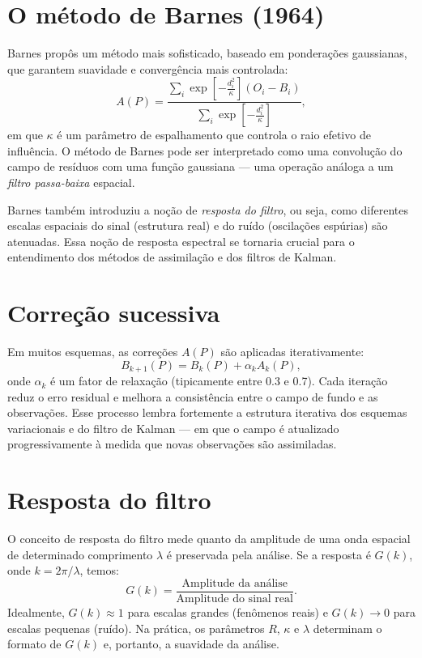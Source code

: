 \section{O método de Barnes (1964)}
Barnes propôs um método mais sofisticado, baseado em ponderações gaussianas, que garantem suavidade e convergência mais controlada:
\begin{equation}
A(P) = \frac{\displaystyle \sum_i \exp\!\left[-\frac{d_i^2}{\kappa}\right] (O_i - B_i)}{\displaystyle \sum_i \exp\!\left[-\frac{d_i^2}{\kappa}\right]},
\label{eq:barnes}
\end{equation}
em que $\kappa$ é um parâmetro de espalhamento que controla o raio efetivo de influência.  
O método de Barnes pode ser interpretado como uma convolução do campo de resíduos com uma função gaussiana — uma operação análoga a um \emph{filtro passa-baixa} espacial.

Barnes também introduziu a noção de \emph{resposta do filtro}, ou seja, como diferentes escalas espaciais do sinal (estrutura real) e do ruído (oscilações espúrias) são atenuadas.  
Essa noção de resposta espectral se tornaria crucial para o entendimento dos métodos de assimilação e dos filtros de Kalman.

\section{Correção sucessiva}
Em muitos esquemas, as correções $A(P)$ são aplicadas iterativamente:
\begin{equation}
B_{k+1}(P) = B_k(P) + \alpha_k A_k(P),
\label{eq:successive}
\end{equation}
onde $\alpha_k$ é um fator de relaxação (tipicamente entre 0.3 e 0.7).  
Cada iteração reduz o erro residual e melhora a consistência entre o campo de fundo e as observações.  
Esse processo lembra fortemente a estrutura iterativa dos esquemas variacionais e do filtro de Kalman — em que o campo é atualizado progressivamente à medida que novas observações são assimiladas.

\section{Resposta do filtro}
O conceito de resposta do filtro mede quanto da amplitude de uma onda espacial de determinado comprimento $\lambda$ é preservada pela análise.  
Se a resposta é $G(k)$, onde $k=2\pi/\lambda$, temos:
\[
G(k) = \frac{\text{Amplitude da análise}}{\text{Amplitude do sinal real}}.
\]
Idealmente, $G(k)\approx1$ para escalas grandes (fenômenos reais) e $G(k)\to0$ para escalas pequenas (ruído).  
Na prática, os parâmetros $R$, $\kappa$ e $\lambda$ determinam o formato de $G(k)$ e, portanto, a suavidade da análise.

